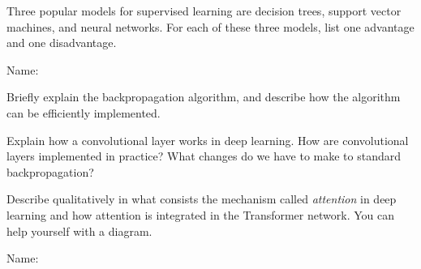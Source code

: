 \documentclass[11pt]{article}
\newcounter{marks}
\begin{document}
\begin{list}{{\bf Question :}}
\item
{}
\addtocounter{marks}{1}
Three popular models for supervised learning are decision trees, support vector machines, and neural networks. For each of these three models, list one advantage and one disadvantage.

\framebox[16cm][l]{ 
\parbox{15.9cm}{
\vspace*{6.2cm}
}}


\pagebreak

Name: \dotfill

\item
{}
\addtocounter{marks}{1}
Briefly explain the backpropagation algorithm, and describe how the algorithm can be efficiently implemented.

\framebox[16cm][l]{
\parbox{15.9cm}{
\vspace*{6.2cm}
}}

\item
{}
\addtocounter{marks}{1}
Explain how a convolutional layer works in deep learning. How are convolutional layers implemented in practice? What changes do we have to make to standard backpropagation?

\framebox[16cm][l]{ 
\parbox{15.9cm}{
\vspace*{6.2cm}
}}


\item
{}
\addtocounter{marks}{1}
Describe qualitatively in what consists the mechanism called \emph{attention} in deep learning and how attention is integrated in the Transformer network.
You can help yourself with a diagram.

\framebox[16cm][l]{ 
\parbox{15.9cm}{
\vspace*{6.2cm}
}}


\pagebreak

Name: \dotfill


\end{list}
\end{document}
